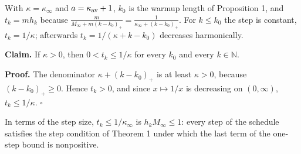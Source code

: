 \documentclass[11pt,a4paper]{article}
\begin{document}
With \(\kappa=\kappa_\infty\) and \(a=\kappa_{\rm av}+1\), \(k_0\) is the warmup length of Proposition 1, and \(t_k=mh_k\) because \(\frac m{M_\infty+m(k-k_0)_+}=\frac1{\kappa_\infty+(k-k_0)_+}\). For \(k\le k_0\) the step is constant, \(t_k=1/\kappa\); afterwards \(t_k=1/(\kappa+k-k_0)\) decreases harmonically.




\textbf{Claim.} If \(\kappa>0\), then \(0<t_k\le1/\kappa\) for every \(k_0\) and every \(k\in\mathbb N\).




\textbf{Proof.} The denominator \(\kappa+(k-k_0)_+\) is at least \(\kappa>0\), because \((k-k_0)_+\ge0\). Hence \(t_k>0\), and since \(x\mapsto1/x\) is decreasing on \((0,\infty)\), \(t_k\le1/\kappa\). \(\square\)




In terms of the step size, \(t_k\le1/\kappa_\infty\) is \(h_kM_\infty\le1\): every step of the schedule satisfies the step condition of Theorem 1 under which the last term of the one-step bound is nonpositive.
\end{document}
